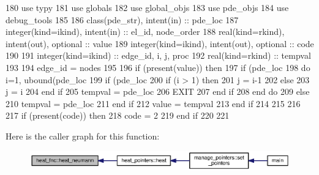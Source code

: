 \begin{DoxyCode}
180       \textcolor{keywordtype}{use }typy
181       \textcolor{keywordtype}{use }globals
182       \textcolor{keywordtype}{use }global_objs
183       \textcolor{keywordtype}{use }pde_objs
184       \textcolor{keywordtype}{use }debug_tools
185       
186       \textcolor{keywordtype}{class}(pde_str), \textcolor{keywordtype}{intent(in)} :: pde\_loc
187       \textcolor{keywordtype}{integer(kind=ikind)}, \textcolor{keywordtype}{intent(in)}  :: el\_id, node\_order
188       \textcolor{keywordtype}{real(kind=rkind)}, \textcolor{keywordtype}{intent(out)}, \textcolor{keywordtype}{optional}    :: value
189       \textcolor{keywordtype}{integer(kind=ikind)}, \textcolor{keywordtype}{intent(out)}, \textcolor{keywordtype}{optional} :: code
190       
191       \textcolor{keywordtype}{integer(kind=ikind)} :: edge\_id, i, j, proc
192       \textcolor{keywordtype}{real(kind=rkind)} :: tempval
193       
194       edge\_id = nodes%
195       
196       \textcolor{keywordflow}{if} (\textcolor{keyword}{present}(\textcolor{keywordtype}{value})) \textcolor{keywordflow}{then}
197         \textcolor{keywordflow}{if} (pde\_loc%
198           \textcolor{keywordflow}{do} i=1, ubound(pde\_loc%
199             \textcolor{keywordflow}{if} (pde\_loc%
200               \textcolor{keywordflow}{if} (i > 1) \textcolor{keywordflow}{then}
201                 j = i-1
202               \textcolor{keywordflow}{else}
203                 j = i
204 \textcolor{keywordflow}{              end if}
205               tempval = pde\_loc%
206               \textcolor{keywordflow}{EXIT}
207 \textcolor{keywordflow}{            end if}
208 \textcolor{keywordflow}{          end do}
209         \textcolor{keywordflow}{else}
210           tempval =  pde\_loc%
211 \textcolor{keywordflow}{        end if}
212         \textcolor{keywordtype}{value} = tempval 
213 \textcolor{keywordflow}{      end if}
214 
215 
216       
217       \textcolor{keywordflow}{if} (\textcolor{keyword}{present}(code)) \textcolor{keywordflow}{then}
218         code = 2
219 \textcolor{keywordflow}{      end if}
220       
221 
\end{DoxyCode}


Here is the caller graph for this function\+:\nopagebreak
\begin{figure}[H]
\begin{center}
\leavevmode
\includegraphics[width=350pt]{namespaceheat__fnc_aa6d2b31a7d81e956bcc14f955b6ca95f_icgraph}
\end{center}
\end{figure}


